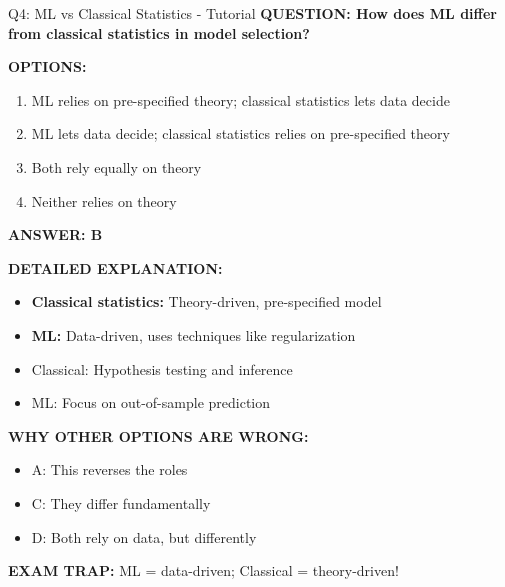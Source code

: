 \documentclass[8pt]{beamer}
\begin{document}
	\begin{frame}{Q4: ML vs Classical Statistics - Tutorial}
		\fontsize{6.5}{7.5}\selectfont
		\textbf{QUESTION: How does ML differ from classical statistics in model selection?}
		
		\vspace{0.1cm}
		\textbf{OPTIONS:}
		\begin{enumerate}
			\item ML relies on pre-specified theory; classical statistics lets data decide
			\item ML lets data decide; classical statistics relies on pre-specified theory
			\item Both rely equally on theory
			\item Neither relies on theory
		\end{enumerate}
		
		\vspace{0.1cm}
		\textcolor{myblue}{\textbf{ANSWER: B}}
		
		\vspace{0.1cm}
		\textbf{DETAILED EXPLANATION:}
		\begin{itemize}
			\item \textbf{Classical statistics:} Theory-driven, pre-specified model
			\item \textbf{ML:} Data-driven, uses techniques like regularization
			\item Classical: Hypothesis testing and inference
			\item ML: Focus on out-of-sample prediction
		\end{itemize}
		
		\vspace{0.1cm}
		\textcolor{myred}{\textbf{WHY OTHER OPTIONS ARE WRONG:}}
		\begin{itemize}
			\item \textcolor{myred}{A:} This reverses the roles
			\item \textcolor{myred}{C:} They differ fundamentally
			\item \textcolor{myred}{D:} Both rely on data, but differently
		\end{itemize}
		
		\textcolor{myred}{\textbf{EXAM TRAP:}} ML = \textcolor{myblue}{data-driven}; Classical = \textcolor{myblue}{theory-driven}!
	\end{frame}
	
\end{document}

